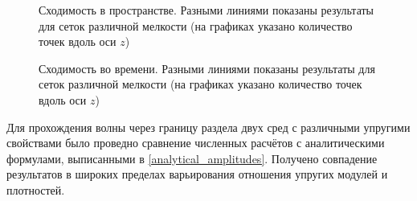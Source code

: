 \begin{figure}%
	\caption{\small{Сходимость в пространстве. Разными линиями показаны результаты для сеток различной мелкости (на графиках указано количество точек вдоль оси $z$)}}
	\label{pic:convergence-szz}
\end{figure}

\begin{figure}%
	\caption{\small{Сходимость во времени. Разными линиями показаны результаты для сеток различной мелкости (на графиках указано количество точек вдоль оси $z$)}}
	\label{pic:convergence-detector}
\end{figure}

Для прохождения волны через границу раздела двух сред с различными упругими свойствами было проведно сравнение численных расчётов с аналитическими формулами, выписанными в \ref{analytical_amplitudes}. Получено совпадение результатов в широких пределах варьирования отношения упругих модулей и плотностей.


